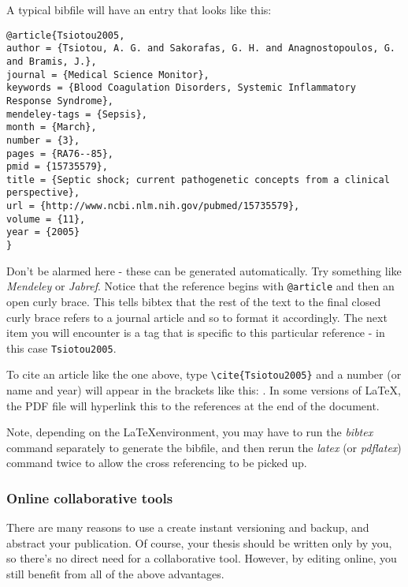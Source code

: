 A typical bibfile will have an entry that looks like this:

\begin{verbatim}
@article{Tsiotou2005,
author = {Tsiotou, A. G. and Sakorafas, G. H. and Anagnostopoulos, G. and Bramis, J.},
journal = {Medical Science Monitor},
keywords = {Blood Coagulation Disorders, Systemic Inflammatory Response Syndrome},
mendeley-tags = {Sepsis},
month = {March},
number = {3},
pages = {RA76--85},
pmid = {15735579},
title = {Septic shock; current pathogenetic concepts from a clinical perspective},
url = {http://www.ncbi.nlm.nih.gov/pubmed/15735579},
volume = {11},
year = {2005}
}
\end{verbatim}

Don't be alarmed here - these can be generated automatically. Try something like {\it Mendeley} or {\it Jabref}. %
Notice that the reference begins with \verb|@article| and then an open curly brace.
This tells bibtex that the rest of the text to the final closed curly brace refers to a journal article and so to format it accordingly. The next item you will encounter is a tag that is specific to this particular reference - in this case \verb|Tsiotou2005|.





To cite an article like the one above, type  \verb|\cite{Tsiotou2005}|
and a number (or name and year) will appear in the brackets like this:
\cite{Tsiotou2005}. In some versions of \LaTeX, the PDF file will 
hyperlink this to the references at the end of the document.

Note, depending on the \LaTeX environment, you may have to run the 
{\it bibtex} command separately to generate the bibfile, and then 
rerun the {\it latex} (or {\it pdflatex}) command twice to allow the cross referencing
to be picked up.

\subsubsection{Online collaborative tools}
There are many reasons to use a 
create instant versioning and backup, and abstract your publication.
Of course, your thesis should be written only by you, so there's no direct need for a collaborative tool. However, by editing online, you still benefit from all of the above advantages.

